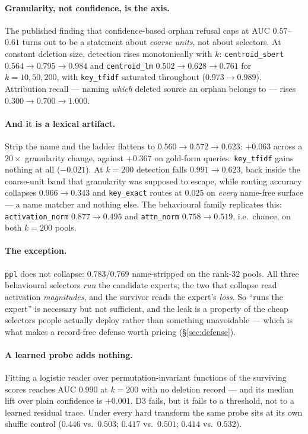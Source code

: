 \documentclass[11pt]{article}
\begin{document}
\paragraph{Granularity, not confidence, is the axis.} The published finding that confidence-based
orphan refusal caps at AUC $0.57$--$0.61$ turns out to be a statement about \emph{coarse units},
not about selectors. At constant deletion size, detection rises monotonically with $k$:
\texttt{centroid\_sbert} $0.564 \to 0.795 \to 0.984$ and \texttt{centroid\_lm} $0.502 \to 0.628 \to
0.761$ for $k = 10, 50, 200$, with \texttt{key\_tfidf} saturated throughout ($0.973 \to 0.989$).
Attribution recall --- naming \emph{which} deleted source an orphan belongs to --- rises $0.300 \to
0.700 \to 1.000$.

\paragraph{And it is a lexical artifact.} Strip the name and the ladder flattens to $0.560 \to
0.572 \to 0.623$: $+0.063$ across a $20\times$ granularity change, against $+0.367$ on gold-form
queries. \texttt{key\_tfidf} gains nothing at all ($-0.021$). At $k=200$ detection falls $0.991 \to
0.623$, back inside the coarse-unit band that granularity was supposed to escape, while routing
accuracy collapses $0.966 \to 0.343$ and \texttt{key\_exact} routes at $0.025$ on \emph{every}
name-free surface --- a name matcher and nothing else. The behavioural family replicates this:
\texttt{activation\_norm} $0.877 \to 0.495$ and \texttt{attn\_norm} $0.758 \to 0.519$, i.e.\ chance,
on both $k=200$ pools.

\paragraph{The exception.} \texttt{ppl} does not collapse: $0.783/0.769$ name-stripped on the
rank-32 pools. All three behavioural selectors \emph{run} the candidate experts; the two that
collapse read activation \emph{magnitudes}, and the survivor reads the expert's \emph{loss}. So
``runs the expert'' is necessary but not sufficient, and the leak is a property of the cheap
selectors people actually deploy rather than something unavoidable --- which is what makes a
record-free defense worth pricing (\S\ref{sec:defense}).

\paragraph{A learned probe adds nothing.} Fitting a logistic reader over permutation-invariant
functions of the surviving scores reaches AUC $0.990$ at $k=200$ with no deletion record --- and its
median lift over plain confidence is $+0.001$. D3 fails, but it fails to a threshold, not to a
learned residual trace. Under every hard transform the same probe sits at its own shuffle control
($0.446$ vs.\ $0.503$; $0.417$ vs.\ $0.501$; $0.414$ vs.\ $0.532$).
\end{document}
